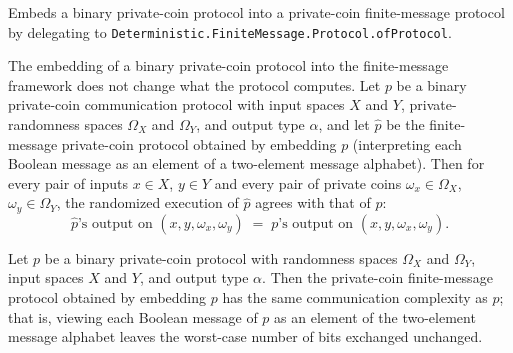 \begin{definition}
\label{CommunicationComplexity.PrivateCoin.FiniteMessage.Protocol.ofProtocol}
\leanok
{}
Embeds a binary private-coin protocol into a private-coin finite-message protocol by
delegating to \texttt{Deterministic.FiniteMessage.Protocol.ofProtocol}.
\end{definition}

\begin{theorem}
\label{CommunicationComplexity.PrivateCoin.FiniteMessage.Protocol.ofProtocol_rrun}
\leanok
{}
The embedding of a binary private-coin protocol into the finite-message framework does
not change what the protocol computes. Let $p$ be a binary private-coin communication
protocol with input spaces $X$ and $Y$, private-randomness spaces $\Omega_X$ and
$\Omega_Y$, and output type $\alpha$, and let $\widehat{p}$ be the finite-message
private-coin protocol obtained by embedding $p$ (interpreting each Boolean message as an
element of a two-element message alphabet). Then for every pair of inputs $x \in X$, $y
\in Y$ and every pair of private coins $\omega_x \in \Omega_X$, $\omega_y \in \Omega_Y$,
the randomized execution of $\widehat{p}$ agrees with that of $p$:
\[
\widehat{p}\text{'s output on }(x, y, \omega_x, \omega_y) \;=\; p\text{'s output on }(x,
y, \omega_x, \omega_y).
\]
\end{theorem}

\begin{theorem}
\label{CommunicationComplexity.PrivateCoin.FiniteMessage.Protocol.ofProtocol_complexity}
\leanok
{}
Let $p$ be a binary private-coin protocol with randomness spaces $\Omega_X$ and
$\Omega_Y$, input spaces $X$ and $Y$, and output type $\alpha$. Then the private-coin
finite-message protocol obtained by embedding $p$ has the same communication complexity
as $p$; that is, viewing each Boolean message of $p$ as an element of the two-element
message alphabet leaves the worst-case number of bits exchanged unchanged.
\end{theorem}

